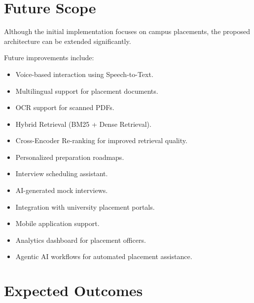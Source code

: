 \documentclass[11pt]{article}
\begin{document}

\section{Future Scope}

Although the initial implementation focuses on campus placements, the proposed architecture can be extended significantly.

Future improvements include:

\begin{itemize}

\item Voice-based interaction using Speech-to-Text.

\item Multilingual support for placement documents.

\item OCR support for scanned PDFs.

\item Hybrid Retrieval (BM25 + Dense Retrieval).

\item Cross-Encoder Re-ranking for improved retrieval quality.

\item Personalized preparation roadmaps.

\item Interview scheduling assistant.

\item AI-generated mock interviews.

\item Integration with university placement portals.

\item Mobile application support.

\item Analytics dashboard for placement officers.

\item Agentic AI workflows for automated placement assistance.

\end{itemize}


\section{Expected Outcomes}
\end{document}
